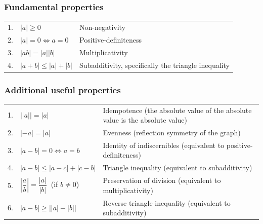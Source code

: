 \subsubsection*{Fundamental properties} \label{Basic Functions/Absolute Value function or Modulus Function/Fundamental properties}

\begin{customArrayStretch}{1.2}
\begin{tabular}{r l l}
     1. & ${\displaystyle |a|\geq 0}$ & Non-negativity \\

     2. & ${\displaystyle |a|=0\iff a=0}$ & Positive-definiteness \\

     3. & ${\displaystyle |ab|=\left|a\right|\left|b\right|}$ & 	Multiplicativity \\

     4. & ${\displaystyle |a+b|\leq |a|+|b|}$ & 	Subadditivity, specifically the triangle inequality \\
\end{tabular}
\end{customArrayStretch}

\subsubsection*{Additional useful properties \cite{wiki/Absolute-value}} \label{Basic Functions/Absolute Value function or Modulus Function/Additional useful properties}

\begin{customArrayStretch}{1.5}
\begin{tabular}{r l p{13cm}}
     1. & ${\displaystyle {\bigl |}\left|a\right|{\bigr |}=|a|}$ & 	Idempotence (the absolute value of the absolute value is the absolute value) \\

     2. & ${\displaystyle \left|-a\right|=|a|}$ & Evenness (reflection symmetry of the graph) \\

     3. & ${\displaystyle |a-b|=0\iff a=b}$ & 	Identity of indiscernibles (equivalent to positive-definiteness) \\

     4. & ${\displaystyle |a-b|\leq |a-c|+|c-b|}$ & 	Triangle inequality (equivalent to subadditivity) \\

     5. & ${\displaystyle \left|{\dfrac {a}{b}}\right|={\dfrac {|a|}{|b|}}\ }$ (if ${\displaystyle b\neq 0}$) & 	Preservation of division (equivalent to multiplicativity) \\

     6. & ${\displaystyle |a-b|\geq {\bigl |}\left|a\right|-\left|b\right|{\bigr |}}$ & 	Reverse triangle inequality (equivalent to subadditivity) \\
\end{tabular}
\end{customArrayStretch}

